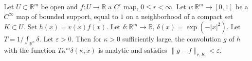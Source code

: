 Let $U \subset \mathbb{R}^m$ be open and $f: U \to \mathbb{R}$ a $C^r$ map, $0 \leqslant r < \infty$. Let $v: \mathbb{R}^m \to [0,1]$ be a $C^\infty$ map of bounded support, equal to $1$ on a neighborhood of a compact set $K \subset U$. Set $h(x) = v(x)f(x)$. Let $\delta: \mathbb{R}^m \to \mathbb{R}$, $\delta(x) = \exp(-|x|^2)$. Let $T = 1/\int_{\mathbb{R}^n} \delta$. Let $\varepsilon > 0$. Then for $\kappa > 0$ sufficiently large, the convolution $g$ of $h$ with the function $T\kappa^m \delta(\kappa,x)$ is analytic and satisfies $\|g - f\|_{r,K} < \varepsilon$.
